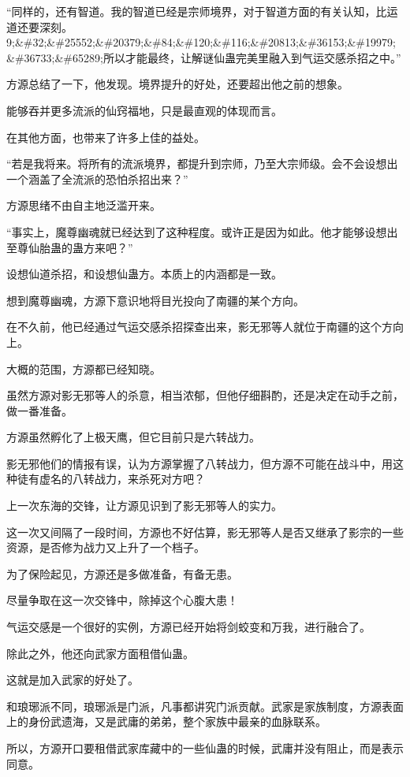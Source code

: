 \begin{this_body}
“同样的，还有智道。我的智道已经是宗师境界，对于智道方面的有关认知，比运道还要深刻。9;\&\#32;\&\#25552;\&\#20379;\&\#84;\&\#120;\&\#116;\&\#20813;\&\#36153;\&\#19979;\&\#36733;\&\#65289;所以才能最终，让解谜仙蛊完美里融入到气运交感杀招之中。”

方源总结了一下，他发现。境界提升的好处，还要超出他之前的想象。

能够吞并更多流派的仙窍福地，只是最直观的体现而言。

在其他方面，也带来了许多上佳的益处。

“若是我将来。将所有的流派境界，都提升到宗师，乃至大宗师级。会不会设想出一个涵盖了全流派的恐怕杀招出来？”

方源思绪不由自主地泛滥开来。

“事实上，魔尊幽魂就已经达到了这种程度。或许正是因为如此。他才能够设想出至尊仙胎蛊的蛊方来吧？”

设想仙道杀招，和设想仙蛊方。本质上的内涵都是一致。

想到魔尊幽魂，方源下意识地将目光投向了南疆的某个方向。

在不久前，他已经通过气运交感杀招探查出来，影无邪等人就位于南疆的这个方向上。

大概的范围，方源都已经知晓。

虽然方源对影无邪等人的杀意，相当浓郁，但他仔细斟酌，还是决定在动手之前，做一番准备。

方源虽然孵化了上极天鹰，但它目前只是六转战力。

影无邪他们的情报有误，认为方源掌握了八转战力，但方源不可能在战斗中，用这种徒有虚名的八转战力，来杀死对方吧？

上一次东海的交锋，让方源见识到了影无邪等人的实力。

这一次又间隔了一段时间，方源也不好估算，影无邪等人是否又继承了影宗的一些资源，是否修为战力又上升了一个档子。

为了保险起见，方源还是多做准备，有备无患。

尽量争取在这一次交锋中，除掉这个心腹大患！

气运交感是一个很好的实例，方源已经开始将剑蛟变和万我，进行融合了。

除此之外，他还向武家方面租借仙蛊。

这就是加入武家的好处了。

和琅琊派不同，琅琊派是门派，凡事都讲究门派贡献。武家是家族制度，方源表面上的身份武遗海，又是武庸的弟弟，整个家族中最亲的血脉联系。

所以，方源开口要租借武家库藏中的一些仙蛊的时候，武庸并没有阻止，而是表示同意。


\end{this_body}
